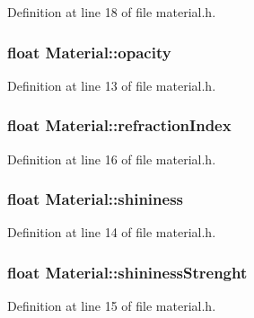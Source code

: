 Definition at line 18 of file material.\+h.

\hypertarget{class_material_a4ddb4745b69e0b8747ef819bc3e3ceee}{}
\subsubsection[{opacity}]{\setlength{\rightskip}{0pt plus 5cm}float Material\+::opacity}\label{class_material_a4ddb4745b69e0b8747ef819bc3e3ceee}


Definition at line 13 of file material.\+h.

\hypertarget{class_material_a52b96d96f3a3c9bf506fd7dc7ff6f40a}{}
\subsubsection[{refraction\+Index}]{\setlength{\rightskip}{0pt plus 5cm}float Material\+::refraction\+Index}\label{class_material_a52b96d96f3a3c9bf506fd7dc7ff6f40a}


Definition at line 16 of file material.\+h.

\hypertarget{class_material_a9dc184c883ec135ace28c1917af3fe84}{}
\subsubsection[{shininess}]{\setlength{\rightskip}{0pt plus 5cm}float Material\+::shininess}\label{class_material_a9dc184c883ec135ace28c1917af3fe84}


Definition at line 14 of file material.\+h.

\hypertarget{class_material_a39204190f2a9ff5e1d3ff8f109c97d67}{}
\subsubsection[{shininess\+Strenght}]{\setlength{\rightskip}{0pt plus 5cm}float Material\+::shininess\+Strenght}\label{class_material_a39204190f2a9ff5e1d3ff8f109c97d67}


Definition at line 15 of file material.\+h.

\hypertarget{class_material_aac1c499923ff99564cdd97a4b5e504a9}{}
